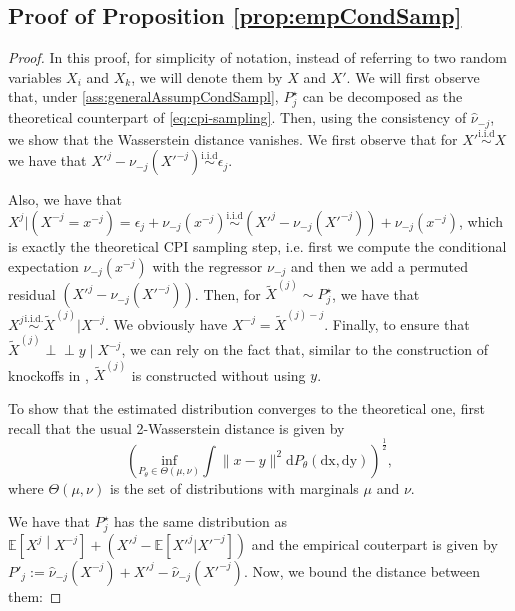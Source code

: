 \documentclass{article}
\theoremstyle{plain}
\theoremstyle{definition}
\theoremstyle{remark}
\newcommand{\e}[1]{\mathbb{E}\left[#1\right]  } %
\newcommand{\indep}{\perp\!\!\!\perp}
\begin{document}
 
\subsection{Proof of Proposition \ref{prop:empCondSamp}}

\begin{proof}
   In this proof, for simplicity of notation, instead of referring to two random variables $X_i$ and $X_k$, we will denote them by $X$ and $X'$. We will first observe that, under \cref{ass:generalAssumpCondSampl}, $P^\star_j$ can be decomposed as the theoretical counterpart of \eqref{eq:cpi-sampling}. Then, using the consistency of $\widehat{\nu}_{-j}$, we show that the Wasserstein distance vanishes.
     We first observe that for $X'\overset{\mathrm{i.i.d}}{\sim}X$ we have that $X'^j-\nu_{-j}\left(X'^{-j}\right)\overset{\mathrm{i.i.d}}{\sim}\epsilon_j$.
 
 Also, we have that $X^j|\left(X^{-j}=x^{-j}\right)= \epsilon_j+\nu_{-j}(x^{-j})\overset{{\mathrm{i.i.d}}}{\sim}\left(X'^j-\nu_{-j}\left(X'^{-j}\right)\right)+\nu_{-j}(x^{-j})$, which is exactly the theoretical CPI sampling step, i.e. first we compute the conditional expectation $\nu_{-j}(x^{-j})$ with the regressor $\nu_{-j}$ and then we add a permuted residual $\left(X'^j-\nu_{-j}\left(X'^{-j}\right)\right)$. Then, for $\widetilde{X}^{(j)}\sim P^\star_j$, we have that $X^j\overset{\mathrm{i.i.d.}}{\sim}\widetilde{X}^{(j)}|X^{-j}$. We obviously have $X^{-j}=\widetilde{X}^{(j)-j}$. Finally, to ensure that $\widetilde{X}^{(j)} \indep y \mid X^{-j}$, we can rely on the fact that, similar to the construction of knockoffs in \citet{candes2017panninggoldmodelxknockoffs}, $\widetilde{X}^{(j)}$ is constructed without using $y$.

 
    To show that the estimated distribution converges to the theoretical one, first recall that the usual 2-Wasserstein distance is given by 
    $$\left(\underset{P_\theta\in \Theta (\mu, \nu)}{\mathrm{inf}}\int \|x-y\|^2\mathrm{d}P_\theta (\mathrm{dx,dy})\right)^{\frac{1}{2}},$$
    where $\Theta(\mu, \nu)$ is the set of distributions with marginals $\mu$ and $\nu$. 
    
    We have that $P^\star_j$ has the same distribution as $\e{X^j\middle|X^{-j}}+\left(X'^{j}-\e{X'^j|X'^{-j}}\right)$ and the empirical couterpart is given by $P'_j:=\widehat{\nu}_{-j}\left(X^{-j}\right)+X'^{j}-\widehat{\nu}_{-j}\left(X'^{-j}\right)$. Now, we bound the distance between them:
    

\end{proof}
\end{document}
